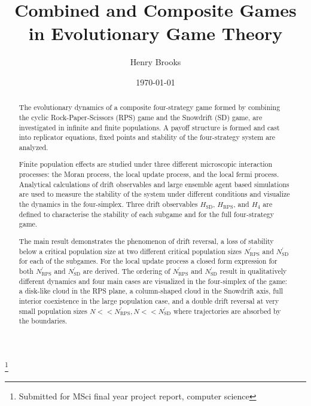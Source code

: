\documentclass[%
 reprint,
 amsmath,amssymb,
 aps,
]{revtex4-2}
\begin{document}

\title{Combined and Composite Games in Evolutionary Game Theory}%
\thanks{Submitted for MSci final year project report, computer science}%

\author{Henry Brooks}
%


\date{\today}%

\begin{abstract}
The evolutionary dynamics of a composite four-strategy game formed by combining the cyclic Rock-Paper-Scissors (RPS)
game and the Snowdrift (SD) game, are investigated in infinite and finite populations. A payoff structure is
formed and cast into replicator equations, fixed points and stability of the four-strategy system are 
analyzed.

Finite population effects are studied under three different microscopic interaction processes:
the Moran process, the local update process, and the local fermi process. Analytical calculations
of drift observables and large ensemble agent based simulations are used to 
measure the stability of the system under different conditions and visualize the 
dynamics in the four-simplex.
Three drift observables $H_{\mathrm{SD}}$, $H_{\mathrm{RPS}}$, and $H_4$ are defined to 
characterise the stability of each subgame and for the full four-strategy game.

The main result demonstrates the phenomenon of drift reversal, a loss of stability below a critical population size
at two different critical population sizes $N^\prime_{\mathrm{RPS}}$ and 
$N^\prime_{\mathrm{SD}}$ for each of the subgames. For the local update process a closed form expression for 
both $N^\prime_{\mathrm{RPS}}$ and $N^\prime_{\mathrm{SD}}$ are derived.
The ordering of $N^\prime_{\mathrm{RPS}}$ and $N^\prime_{\mathrm{SD}}$ result in qualitatively different
dynamics and four main cases are visualized in the four-simplex of the game: 
a disk-like cloud in the RPS plane, a column-shaped cloud in the Snowdrift axis, full interior coexistence in the large 
population case, and a double drift reversal at very small population sizes $N << N^\prime_{\mathrm{RPS}}, 
N << N^\prime_{\mathrm{SD}}$ where trajectories are absorbed by the boundaries. 
\end{abstract}

\maketitle
\end{document}
